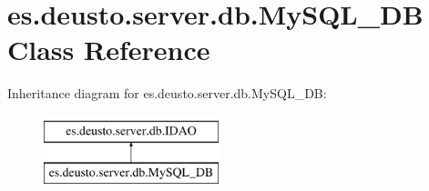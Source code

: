 \hypertarget{classes_1_1deusto_1_1server_1_1db_1_1_my_s_q_l___d_b}{}\section{es.\+deusto.\+server.\+db.\+My\+S\+Q\+L\+\_\+\+DB Class Reference}
\label{classes_1_1deusto_1_1server_1_1db_1_1_my_s_q_l___d_b}
Inheritance diagram for es.\+deusto.\+server.\+db.\+My\+S\+Q\+L\+\_\+\+DB\+:\begin{figure}[H]
\begin{center}
\leavevmode
\includegraphics[height=2.000000cm]{classes_1_1deusto_1_1server_1_1db_1_1_my_s_q_l___d_b}
\end{center}
\end{figure}
